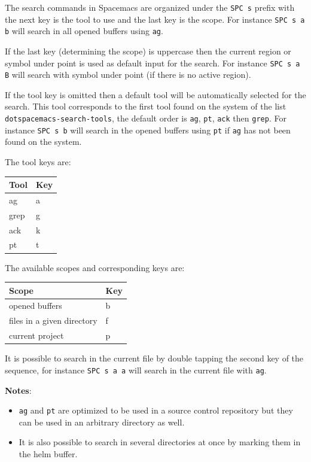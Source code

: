 \documentclass[11pt]{article}
\begin{document}
The search commands in Spacemacs are organized under the \texttt{SPC s} prefix with the
next key is the tool to use and the last key is the scope. For instance \texttt{SPC s a
b} will search in all opened buffers using \texttt{ag}.

If the last key (determining the scope) is uppercase then the current region or
symbol under point is used as default input for the search. For instance \texttt{SPC s
a B} will search with symbol under point (if there is no active region).

If the tool key is omitted then a default tool will be automatically selected
for the search. This tool corresponds to the first tool found on the system of
the list \texttt{dotspacemacs-search-tools}, the default order is \texttt{ag}, \texttt{pt}, \texttt{ack}
then \texttt{grep}. For instance \texttt{SPC s b} will search in the opened buffers using \texttt{pt}
if \texttt{ag} has not been found on the system.

The tool keys are:

\begin{center}
\begin{tabular}{ll}
Tool & Key\\
\hline
ag & a\\
grep & g\\
ack & k\\
pt & t\\
\end{tabular}
\end{center}

The available scopes and corresponding keys are:

\begin{center}
\begin{tabular}{ll}
Scope & Key\\
\hline
opened buffers & b\\
files in a given directory & f\\
current project & p\\
\end{tabular}
\end{center}

It is possible to search in the current file by double tapping the second key
of the sequence, for instance \texttt{SPC s a a} will search in the current
file with \texttt{ag}.

\textbf{Notes}:
\begin{itemize}
\item \texttt{ag} and \texttt{pt} are optimized to be used in a source control repository but
they can be used in an arbitrary directory as well.
\item It is also possible to search in several directories at once by marking
them in the helm buffer.
\end{itemize}
\end{document}
